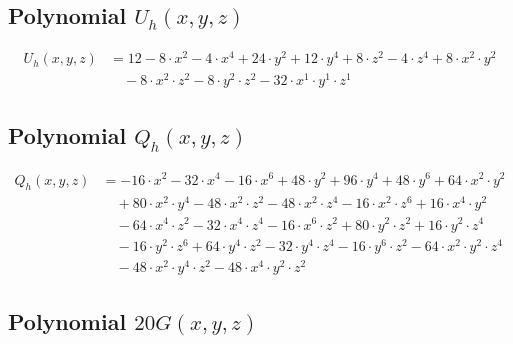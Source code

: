\subsection{Polynomial $U_h(x,y,z)$}
\begin{align*}U_h(x,y,z)&=12-8\cdot x^{2}-4\cdot x^{4}+24\cdot y^{2}+12\cdot y^{4}+8\cdot z^{2}-4\cdot z^{4}+8\cdot x^{2}\cdot y^{2}\\
&\quad -8\cdot x^{2}\cdot z^{2}-8\cdot y^{2}\cdot z^{2}-32\cdot x^{1}\cdot y^{1}\cdot z^{1}\end{align*}\subsection{Polynomial $Q_h(x,y,z)$}
\begin{align*}Q_h(x,y,z)&=-16\cdot x^{2}-32\cdot x^{4}-16\cdot x^{6}+48\cdot y^{2}+96\cdot y^{4}+48\cdot y^{6}+64\cdot x^{2}\cdot y^{2}\\
&\quad +80\cdot x^{2}\cdot y^{4}-48\cdot x^{2}\cdot z^{2}-48\cdot x^{2}\cdot z^{4}-16\cdot x^{2}\cdot z^{6}+16\cdot x^{4}\cdot y^{2}\\
&\quad -64\cdot x^{4}\cdot z^{2}-32\cdot x^{4}\cdot z^{4}-16\cdot x^{6}\cdot z^{2}+80\cdot y^{2}\cdot z^{2}+16\cdot y^{2}\cdot z^{4}\\
&\quad -16\cdot y^{2}\cdot z^{6}+64\cdot y^{4}\cdot z^{2}-32\cdot y^{4}\cdot z^{4}-16\cdot y^{6}\cdot z^{2}-64\cdot x^{2}\cdot y^{2}\cdot z^{4}\\
&\quad -48\cdot x^{2}\cdot y^{4}\cdot z^{2}-48\cdot x^{4}\cdot y^{2}\cdot z^{2}\end{align*}\subsection{Polynomial $20G(x,y,z)$}
